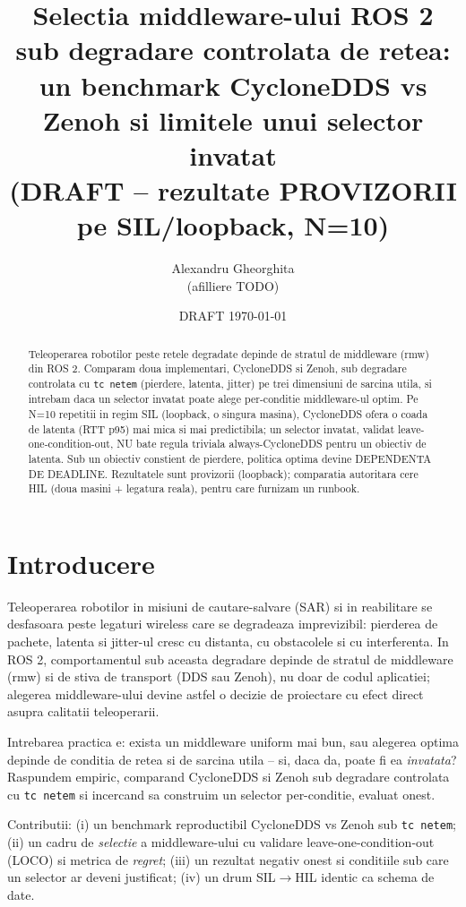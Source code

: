 \documentclass[11pt]{article}
\title{Selectia middleware-ului ROS 2 sub degradare controlata de retea:\\
       un benchmark CycloneDDS vs Zenoh si limitele unui selector invatat\\
       \large (DRAFT -- rezultate PROVIZORII pe SIL/loopback, N=10)}
\author{Alexandru Gheorghita \\ (afilliere TODO)}
\date{DRAFT \today}
\begin{document}
\maketitle

\begin{abstract}
Teleoperarea robotilor peste retele degradate depinde de stratul de middleware (rmw)
din ROS 2. Comparam doua implementari, CycloneDDS si Zenoh, sub degradare controlata cu
\texttt{tc netem} (pierdere, latenta, jitter) pe trei dimensiuni de sarcina utila, si
intrebam daca un selector invatat poate alege per-conditie middleware-ul optim.
Pe N=10 repetitii in regim SIL (loopback, o singura masina), CycloneDDS ofera o coada de
latenta (RTT p95) mai mica si mai predictibila; un selector invatat, validat
leave-one-condition-out, NU bate regula triviala always-CycloneDDS pentru un obiectiv de
latenta. Sub un obiectiv constient de pierdere, politica optima devine DEPENDENTA DE
DEADLINE. Rezultatele sunt provizorii (loopback); comparatia autoritara cere HIL (doua
masini + legatura reala), pentru care furnizam un runbook.
\end{abstract}

\section{Introducere}
Teleoperarea robotilor in misiuni de cautare-salvare (SAR) si in reabilitare se desfasoara
peste legaturi wireless care se degradeaza imprevizibil: pierderea de pachete, latenta si
jitter-ul cresc cu distanta, cu obstacolele si cu interferenta. In ROS 2, comportamentul sub
aceasta degradare depinde de stratul de middleware (rmw) si de stiva de transport (DDS sau
Zenoh), nu doar de codul aplicatiei; alegerea middleware-ului devine astfel o decizie de
proiectare cu efect direct asupra calitatii teleoperarii.

Intrebarea practica e: exista un middleware uniform mai bun, sau alegerea optima depinde de
conditia de retea si de sarcina utila -- si, daca da, poate fi ea \emph{invatata}? Raspundem
empiric, comparand CycloneDDS si Zenoh sub degradare controlata cu \texttt{tc netem} si
incercand sa construim un selector per-conditie, evaluat onest.

Contributii: (i) un benchmark reproductibil CycloneDDS vs Zenoh sub \texttt{tc netem};
(ii) un cadru de \emph{selectie} a middleware-ului cu validare leave-one-condition-out
(LOCO) si metrica de \emph{regret}; (iii) un rezultat negativ onest si conditiile sub care
un selector ar deveni justificat; (iv) un drum SIL$\rightarrow$HIL identic ca schema de date.
\end{document}

